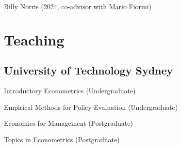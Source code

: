 \documentclass[10pt,letterpaper]{article}
\renewenvironment{itemize}{
  \begin{list}{}{
      \setlength{\leftmargin}{1.5em}
      \setlength{\itemsep}{0.25em}
      \setlength{\parskip}{0pt}
      \setlength{\parsep}{0.25em}
    }
}{
  \end{list}
}
\begin{document}
\begin{itemize}
\item Billy Norris (2024, co-advisor with Mario Fiorini)
\end{itemize}

\section*{Teaching}

%

\subsection*{University of Technology Sydney}

\begin{itemize}
\item Introductory Econometrics (Undergraduate)
\item Empirical Methods for Policy Evaluation (Undergraduate)
\item Economics for Management (Postgraduate)
\item Topics in Econometrics (Postgraduate)
\end{itemize}

\end{document}
